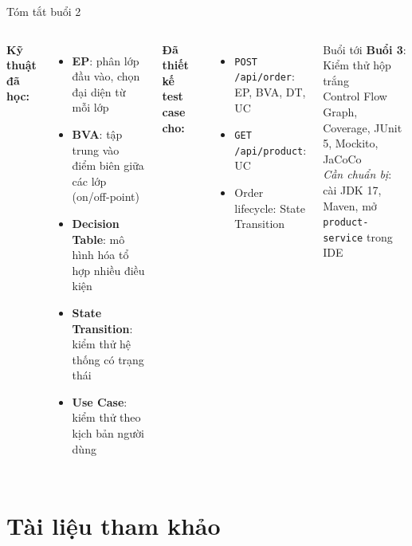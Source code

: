 \documentclass[aspectratio=169,12pt]{beamer}
\begin{document}
\begin{frame}{Tóm tắt buổi 2}
  \begin{columns}
    \textbf{Kỹ thuật đã học:}
    \begin{itemize}
      \item \textbf{EP}: phân lớp đầu vào, chọn đại diện từ mỗi lớp
      \item \textbf{BVA}: tập trung vào điểm biên giữa các lớp (on/off-point)
      \item \textbf{Decision Table}: mô hình hóa tổ hợp nhiều điều kiện
      \item \textbf{State Transition}: kiểm thử hệ thống có trạng thái
      \item \textbf{Use Case}: kiểm thử theo kịch bản người dùng
    \end{itemize}

    \textbf{Đã thiết kế test case cho:}
    \begin{itemize}
      \item \texttt{POST /api/order}: EP, BVA, DT, UC
      \item \texttt{GET /api/product}: UC
      \item Order lifecycle: State Transition
    \end{itemize}

    \vspace{0.4em}
    \begin{block}{Buổi tới}
      \textbf{Buổi 3}: Kiểm thử hộp trắng\\
      Control Flow Graph, Coverage, JUnit 5, Mockito, JaCoCo\\[0.2em]
      \textit{Cần chuẩn bị}: cài JDK 17, Maven, mở
      \texttt{product-service} trong IDE
    \end{block}
  \end{columns}
\end{frame}


\section{Tài liệu tham khảo}
\end{document}
